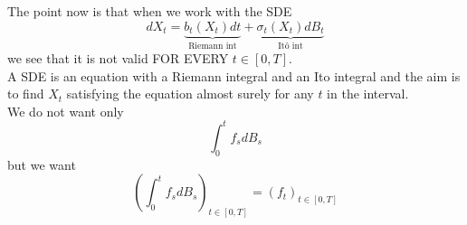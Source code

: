 The point now is that when we work with the SDE
\begin{equation*}
    dX_t = \underbrace{b_t(X_t) dt}_{\text{Riemann int}} + \underbrace{\sigma_t(X_t) dB_t }_{\text{Itô int}} 
\end{equation*}
we see that it is not valid FOR EVERY $t \in [0,T]$. \\
A SDE is an equation with a Riemann integral and an Ito integral and the aim is to find $X_t $ satisfying the equation almost surely for any $t$ in the interval. \\
We do not want only
\begin{equation*}
    \int_0^t f_s dB_s
\end{equation*}
but we want 
\begin{equation*}
(\int_0^t f_s dB_s)_{t \in [0,T]} = (f_t)_{t \in [0,T]}
\end{equation*}

